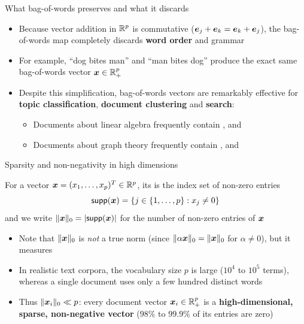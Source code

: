 \documentclass[aspectratio=169]{beamer}\usepackage[]{graphicx}\usepackage[]{xcolor}
\begin{document}
\begin{frame}{What bag-of-words preserves and what it discards}
\begin{itemize}
\item Because vector addition in $\mathbb{R}^p$ is commutative ($\bm{e}_j + \bm{e}_k = \bm{e}_k + \bm{e}_j$), the bag-of-words map completely discards \textbf{word order} and grammar
\vfill
\item For example, ``dog bites man'' and ``man bites dog'' produce the exact same bag-of-words vector $\bm{x} \in \mathbb{R}_+^p$
\vfill
\item Despite this simplification, bag-of-words vectors are remarkably effective for \textbf{topic classification}, \textbf{document clustering} and \textbf{search}:
\begin{itemize}
\item Documents about linear algebra frequently contain ,  and 
\item Documents about graph theory frequently contain ,  and 
\end{itemize}
\end{itemize}
\end{frame}


\begin{frame}{Sparsity and non-negativity in high dimensions}
\begin{definition}
For a vector $\bm{x} = (x_1, \ldots, x_p)^T \in \mathbb{R}^p$, its  is the index set of non-zero entries
\[
\mathsf{supp}(\bm{x}) = \{j \in \{1, \ldots, p\} : x_j \neq 0\}
\]
and we write $\|\bm{x}\|_0 = |\mathsf{supp}(\bm{x})|$ for the number of non-zero entries of $\bm{x}$
\end{definition}
\vfill
\begin{itemize}
\item Note that $\|\bm{x}\|_0$ is \emph{not} a true norm (since $\|\alpha \bm{x}\|_0 = \|\bm{x}\|_0$ for $\alpha \neq 0$), but it measures 
\vfill
\item In realistic text corpora, the vocabulary size $p$ is large ($10^4$ to $10^5$ terms), whereas a single document uses only a few hundred distinct words
\vfill
\item Thus $\|\bm{x}_i\|_0 \ll p$: every document vector $\bm{x}_i \in \mathbb{R}_+^p$ is a \textbf{high-dimensional, sparse, non-negative vector} ($98\%$ to $99.9\%$ of its entries are zero)
\end{itemize}
\end{frame}
\end{document}
